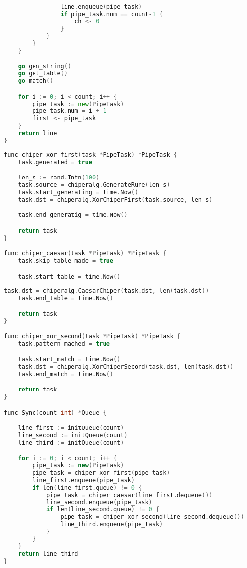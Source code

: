 \begin{lstlisting}[language=Go, label=lst:alg:Parallel2, caption=Реализация параллельного конвейера]

                line.enqueue(pipe_task)
                if pipe_task.num == count-1 {
                    ch <- 0
                }
            }
        }
    }

    go gen_string()
    go get_table()
    go match()

    for i := 0; i < count; i++ {
        pipe_task := new(PipeTask)
        pipe_task.num = i + 1
        first <- pipe_task
    }
    return line
}
\end{lstlisting}
\par \text{  }
\begin{lstlisting}[language=C++, label=lst:alg:Sync, caption=Реализация синхронного конвейера]
func chiper_xor_first(task *PipeTask) *PipeTask {
    task.generated = true

    len_s := rand.Intn(100)
    task.source = chiperalg.GenerateRune(len_s)
    task.start_generating = time.Now()
    task.dst = chiperalg.XorChiperFirst(task.source, len_s)

    task.end_generatig = time.Now()

    return task
}

func chiper_caesar(task *PipeTask) *PipeTask {
    task.skip_table_made = true

    task.start_table = time.Now()
\end{lstlisting}
\par \text{  }
\par \text{  }
\par \text{  }
\begin{lstlisting}[language=C++, label=lst:alg:Sync1, caption=Реализация синхронного конвейера]
    task.dst = chiperalg.CaesarChiper(task.dst, len(task.dst))
    task.end_table = time.Now()

    return task
}

func chiper_xor_second(task *PipeTask) *PipeTask {
    task.pattern_mached = true

    task.start_match = time.Now()
    task.dst = chiperalg.XorChiperSecond(task.dst, len(task.dst))
    task.end_match = time.Now()

    return task
}

func Sync(count int) *Queue {

    line_first := initQueue(count)
    line_second := initQueue(count)
    line_third := initQueue(count)

    for i := 0; i < count; i++ {
        pipe_task := new(PipeTask)
        pipe_task = chiper_xor_first(pipe_task)
        line_first.enqueue(pipe_task)
        if len(line_first.queue) != 0 {
            pipe_task = chiper_caesar(line_first.dequeue())
            line_second.enqueue(pipe_task)
            if len(line_second.queue) != 0 {
                pipe_task = chiper_xor_second(line_second.dequeue())
                line_third.enqueue(pipe_task)
            }
        }
    }
    return line_third
}
        \end{lstlisting}
